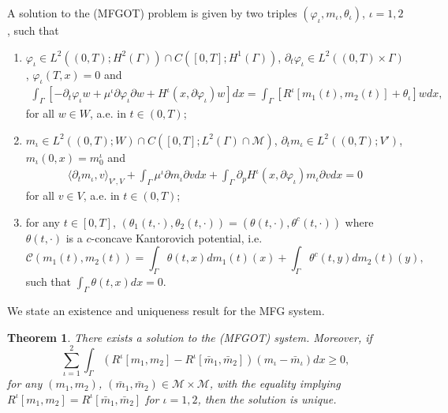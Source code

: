 \documentclass[smallextended,referee,envcountsect,]{svjour3}
\newcommand{\G}{\Gamma}
\newcommand{\cC}{{\mathcal C}}
\newcommand{\cM}{{\mathcal M}}
\renewcommand{\phi}{\varphi}
\renewcommand{\th}{\theta}
\newcommand{\bm}{{\bar m}}
\newtheorem{theo}{\bf Theorem}[section]
\begin{document}
\begin{definition}
	\label{solmfg}
	A solution to the (MFGOT) problem   is given by two triples $(\phi_\iota, m_\iota, \th_\iota)$, $\iota=1,2$, such that 
	\begin{enumerate}
		\item[(i)] 
	$\phi_\iota\in L^2((0, T); H^2(\Gamma))\cap C([0, T]; H^1(\G))$, $\partial_t\phi_\iota\in L^2((0, T)\times\Gamma)$, $\phi_\iota(T, x)=0$ and	 
	\begin{align*}
		\int_{\Gamma}[-\partial_t\phi_\iota w+\mu^\iota\partial \phi_\iota\partial w+H^\iota(x, \partial \phi_\iota)w]dx=\int_{\Gamma}[R^\iota[m_1(t),m_2(t)]+\th_\iota]wdx,
	\end{align*}
for all $w\in W$, a.e. in $t\in(0, T)$;	
	\item[(ii)] $m_\iota\in L^2((0, T); W)\cap C([0, T]; L^2(\Gamma)\cap\cM)$, $\partial_tm_\iota\in L^2((0, T); V')$, \\
	$m_\iota(0, x)=m_0^\iota$ and 
 	\begin{align*}
	\langle \partial_tm_\iota, v\rangle_{V', V}+\int_{\Gamma}\mu^\iota\partial m_\iota\partial vdx+\int_{\Gamma}\partial_pH^\iota(x, \partial\phi_\iota)m_\iota\partial vdx=0
	\end{align*}
for all $v\in V$, a.e. in $t\in(0, T)$;	
\item[(iii)] for any $t\in [0,T]$, $(\th_1(t, \cdot), \th_2(t, \cdot))=(\th(t, \cdot), \th^c(t, \cdot))$ where   $\th(t, \cdot)$ is  a $c$-concave Kantorovich potential, i.e. 	 
	\begin{equation}\label{kantorovich_pot}
		 \cC(m_1(t), m_2(t))=\int_{\Gamma}\th(t, x)dm_1(t)(x)+\int_{\Gamma}\th^c(t, y)dm_2(t)(y),
	\end{equation}
such that $\int_\G \th(t, x)dx=0$.
\end{enumerate}
\end{definition}
We state an existence and uniqueness result for the MFG system.
\begin{theo}
	 There exists a  solution  to the {(MFGOT)} system. Moreover, if 
	 \begin{equation}
       \label{monotonecoupling}
	 \sum_{\iota=1}^2	\int_{\Gamma}(R^\iota[m_1,m_2]-R^\iota[\bm_1,\bm_2])(m_\iota-\bm_\iota)dx\ge 0,
	 \end{equation}
	 for any $(m_1,m_2)$, $(\bm_1,\bm_2)\in \cM\times\cM$, with the equality implying
	 $R^\iota[m_1,m_2]=R^\iota[\bm_1,\bm_2]$ for $\iota=1,2$,
	 then the solution is unique.
\end{theo}
\end{document}
